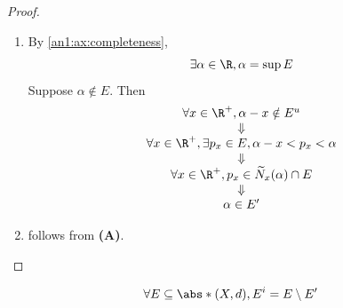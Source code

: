\begin{proof}
  \leavevmode\par
  \begin{enumerate}[label=\textbf{(\Alph*)}]
    \item By \cref{an1:ax:completeness},
          \[
            \exists \alpha \in \R, \alpha = \sup E
          \]
          Suppose $\alpha \notin E$. Then
          \[
            \begin{array}{c}
              \forall x \in \R^{+}, \alpha - x \notin E^{u}                          \\
              \Downarrow                                                             \\
              \forall x \in \R^{+}, \exists p_{x} \in E, \alpha - x < p_{x} < \alpha \\
              \Downarrow                                                             \\
              \forall x \in \R^{+}, p_{x} \in \widetilde{N}_{x}(\alpha) \cap E       \\
              \Downarrow                                                             \\
              \alpha \in E'
            \end{array}
          \]
    \item follows from \textbf{(A)}.
  \end{enumerate}
\end{proof}

\begin{theorem} \label{an1:thm:isolated-points-are-self-minus-limit-points}
  \[
    \forall E \subseteq \abs*{(X, d)}, E^{i} = E \setminus E'
  \]
\end{theorem}

